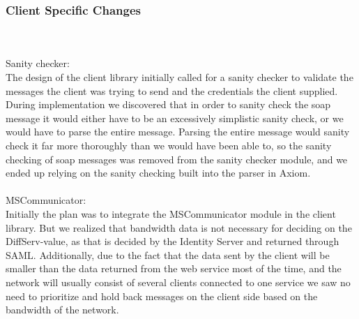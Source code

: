 \subsubsection{Client Specific Changes}\label{Changes:client}
 \\\\
Sanity checker:\\
The design of the client library initially called for a sanity checker to validate the messages the client was trying to send and the credentials the client supplied. During implementation we discovered that in order to sanity check the soap message it would either have to be an excessively simplistic sanity check, or we would have to parse the entire message. Parsing the entire message would sanity check it far more thoroughly than we would have been able to, so the sanity checking of soap messages was removed from the sanity checker module, and we ended up relying on the sanity checking built into the parser in Axiom.
\\\\
MSCommunicator:\\
Initially the plan was to integrate the MSCommunicator module in the client library. But we realized that bandwidth data is not necessary for deciding on the DiffServ-value, as that is decided by the Identity Server and returned through SAML.
Additionally, due to the fact that the data sent by the client will be smaller than the data returned from the web service most of the time, and the network will usually consist of several clients connected to one service we saw no need to prioritize and hold back messages on the client side based on the bandwidth of the network.